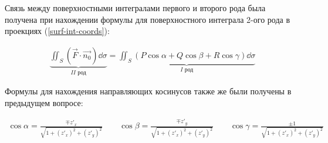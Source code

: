 
Связь между поверхностными интегралами первого и второго рода была получена
при нахождении формулы для поверхностного интеграла 2-ого рода в проекциях
(\ref{surf-int-coords}):

\begin{align*}
  \underbrace{
    \iint_{S} (\vec{F} \cdot \vec{n_{0}}) \dd \sigma
  }_{II \text{ род}}
  = \underbrace{
    \iint_{S} (P \cos \alpha + Q \cos \beta + R \cos \gamma) \dd \sigma
  }_{I \text{ род}}
\end{align*}

Формулы для нахождения направляющих косинусов также же были получены в
предыдущем вопросе:

\begin{align*}
  \cos \alpha = \frac{\mp z'_{x}}{\sqrt{1 + (z'_{x})^2 + (z'_{y})^2}}
  \qquad
  \cos \beta= \frac{\mp z'_{y}}{\sqrt{1 + (z'_{x})^2 + (z'_{y})^2}}
  \qquad
  \cos \gamma = \frac{\pm 1}{\sqrt{1 + (z'_{x})^2 + (z'_{y})^2}}
\end{align*}

